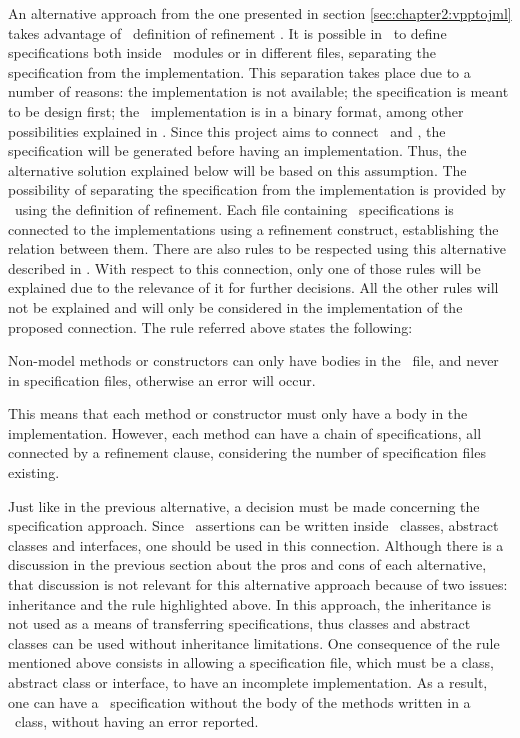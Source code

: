 An alternative approach from the one presented in section \ref{sec:chapter2:vpptojml} takes advantage of \jml\ definition of refinement \cite{leavens-etal07}.
It is possible in \jml\ to define specifications both inside \java\ modules or in different files, separating the specification from the implementation. This separation takes place due to a number of reasons: the implementation is not available; the specification is meant to be design first; the \java\ implementation is in a binary format, among other possibilities explained in \cite{leavens-etal07}. Since this project aims to connect \vpp\ and \jml, the specification will be generated before having an implementation. Thus, the alternative solution explained below will be based on this assumption.
The possibility of separating the specification from the implementation is provided by \jml\ using the definition of refinement. Each file containing \jml\ specifications is connected to the implementations using a refinement construct, establishing the relation between them. There are also rules to be respected using this alternative described in \cite{leavens-etal07}. With respect to this connection, only one of those rules will be explained due to the relevance of it for further decisions. All the other rules will not be explained and will only be considered in the implementation of the proposed connection. The rule referred above states the following:

\begin{ovalenv}
Non-model methods or constructors can only have bodies in the \java\ file, and never in specification files, otherwise an error will occur.
\end{ovalenv}

This means that each method or constructor must only have a body in the implementation. However, each method can have a chain of specifications, all connected by a refinement clause, considering the number of specification files existing. 

Just like in the previous alternative, a decision must be made concerning the specification approach. Since \jml\ assertions can be written inside \java\ classes, abstract classes and interfaces, one should be used in this connection. Although there is a discussion in the previous section about the pros and cons of each alternative, that discussion is not relevant for this alternative approach because of two issues: inheritance and the rule highlighted above. In this approach, the inheritance is not used as a means of transferring specifications, thus classes and abstract classes can be used without inheritance limitations. One consequence of the rule mentioned above consists in allowing a specification file, which must be a class, abstract class or interface, to have an incomplete implementation. As a result, one can have a \jml\ specification without the body of the methods written in a \java\ class, without having an error reported. 

